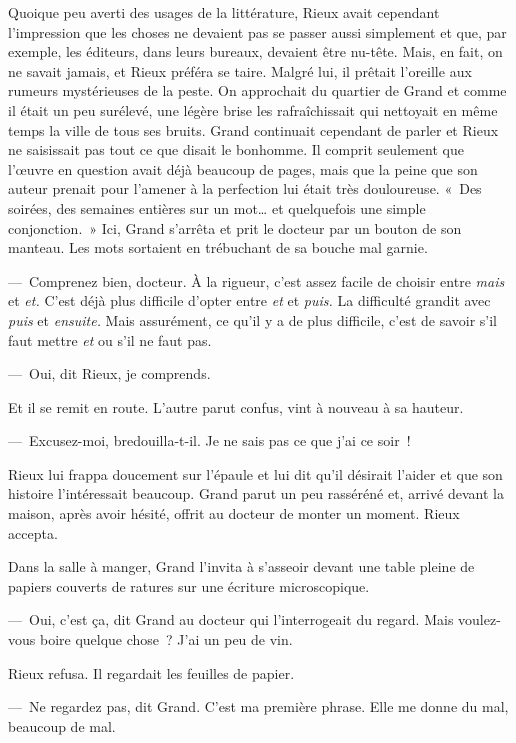 \documentclass[french,twoside]{book} %
\begin{document}
Quoique peu averti des usages de la littérature, Rieux avait cependant l’impression que les choses ne devaient pas se passer aussi simplement et que, par exemple, les éditeurs, dans leurs bureaux, devaient être nu-tête. Mais, en fait, on ne savait jamais, et Rieux préféra se taire. Malgré lui, il prêtait l’oreille aux rumeurs mystérieuses de la peste. On approchait du quartier de Grand et comme il était un peu surélevé, une légère brise les rafraîchissait qui nettoyait en même temps la ville de tous ses bruits. Grand continuait cependant de parler et Rieux ne saisissait pas tout ce que disait le bonhomme. Il comprit seulement que l’œuvre en question avait déjà beaucoup de pages, mais que la peine que son auteur prenait pour l’amener à la perfection lui était très douloureuse. « Des soirées, des semaines entières sur un mot… et quelquefois une simple conjonction. » Ici, Grand s’arrêta et prit le docteur par un bouton de son manteau. Les mots sortaient en trébuchant de sa bouche mal garnie.\par
— Comprenez bien, docteur. À la rigueur, c’est assez facile de choisir entre \emph{mais} et \emph{et.} C’est déjà plus difficile d’opter entre \emph{et} et \emph{puis.} La difficulté grandit avec \emph{puis} et \emph{ensuite.} Mais assurément, ce qu’il y a de plus difficile, c’est de savoir s’il faut mettre \emph{et} ou s’il ne faut pas.\par
— Oui, dit Rieux, je comprends.\par
Et il se remit en route. L’autre parut confus, vint à nouveau à sa hauteur.\par
— Excusez-moi, bredouilla-t-il. Je ne sais pas ce que j’ai ce soir !\par
Rieux lui frappa doucement sur l’épaule et lui dit qu’il désirait l’aider et que son histoire l’intéressait beaucoup. Grand parut un peu rasséréné et, arrivé devant la maison, après avoir hésité, offrit au docteur de monter un moment. Rieux accepta.\par
Dans la salle à manger, Grand l’invita à s’asseoir devant une table pleine de papiers couverts de ratures sur une écriture microscopique.\par
— Oui, c’est ça, dit Grand au docteur qui l’interrogeait du regard. Mais voulez-vous boire quelque chose ? J’ai un peu de vin.\par
Rieux refusa. Il regardait les feuilles de papier.\par
— Ne regardez pas, dit Grand. C’est ma première phrase. Elle me donne du mal, beaucoup de mal.\par
\end{document}
